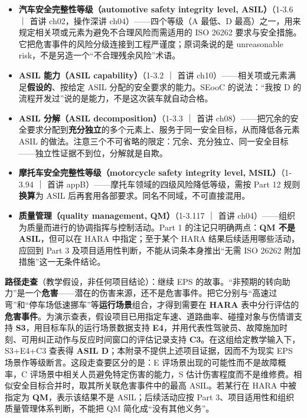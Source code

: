 \begin{itemize}
\item \textbf{汽车安全完整性等级（automotive safety integrity level, ASIL）}（1-3.6 ｜ 首讲 ch02，操作深讲 ch04）——四个等级（A 最低、D 最高）之一，用来规定相关项或元素为避免不合理风险而需适用的 ISO 26262 要求与安全措施。它把危害事件的风险分级连接到工程严谨度；原词条说的是 unreasonable risk，不是另造一个“不合理残余风险”术语。
\item \textbf{ASIL 能力（ASIL capability）}（1-3.2 ｜ 首讲 ch10）——相关项或元素满足\textbf{假设的}、按给定 ASIL 分配的安全要求的能力。SEooC 的说法：“我按 D 的流程开发过”说的是能力，不是这次装车就自动合格。
\item \textbf{ASIL 分解（ASIL decomposition）}（1-3.3 ｜ 首讲 ch08）——把冗余的安全要求分配到\textbf{充分独立}的多个元素上、服务于同一安全目标，从而降低各元素 ASIL 的做法。注意三个不可省略的限定：冗余、充分独立、同一安全目标——独立性证据不到位，分解就是自欺。
\item \textbf{摩托车安全完整性等级（motorcycle safety integrity level, MSIL）}（1-3.94 ｜ 首讲 appB）——摩托车领域的四级风险降低等级，需按 Part 12 规则\textbf{换算}为 ASIL 后再套用各部要求。同名不同域，不可直接混用。
\item \textbf{质量管理（quality management, QM）}（1-3.117 ｜ 首讲 ch04）——组织为质量而进行的协调指挥与控制活动。Part 1 的注记只明确两点：\textbf{QM 不是 ASIL}，但可以在 HARA 中指定；至于某个 HARA 结果后续适用哪些活动，应回到 Part 3 及项目适用性判断，不能从词条本身推出“无需 ISO 26262 附加措施”这一无条件结论。
\end{itemize}

\textbf{路径走查}（教学假设，非任何项目结论）：继续 EPS 的故事。“非预期的转向助力”是一个\textbf{危害}——潜在的伤害来源，还不是危害事件。把它分别与“高速过弯”和“停车场低速挪车”等\textbf{运行场景}组合，才得到需要在 \textbf{HARA} 表中分行评估的\textbf{危害事件}。为演示查表，假设项目已用指定车速、道路曲率、碰撞对象与伤情谱支持 \textbf{S3}，用目标车队的运行场景数据支持 \textbf{E4}，并用代表性驾驶员、故障施加时刻、可用纠正动作与反应时间窗口的评估记录支持 \textbf{C3}。在这组给定教学输入下，S3+E4+C3 查表得 \textbf{ASIL D}；本附录不提供上述项目证据，因而不为现实 EPS 场景作等级断言。这段走查要区分的是：E 评场景出现的可能性而不是故障概率，C 评场景中相关人员避免特定伤害的能力，S 估计伤害程度而不是维修费。相似安全目标合并时，取其所关联危害事件中的最高 ASIL。若某行在 HARA 中被指定为 \textbf{QM}，表示该结果不是 ASIL；后续活动应按 Part 3、项目适用性和组织质量管理体系判断，不能把 QM 简化成“没有其他义务”。


